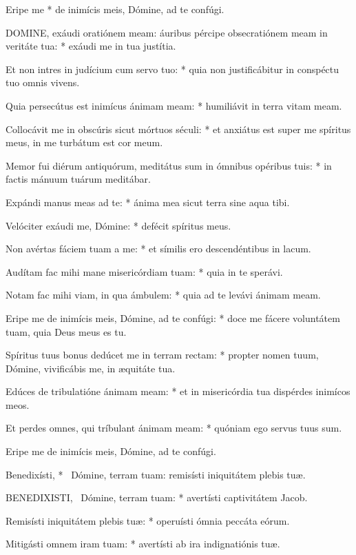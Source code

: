  Eripe me * de inimícis meis, Dómine, ad te confúgi.


\lettrine[lines=2]{D}{OMINE}, exáudi oratiónem meam: áuribus pércipe obsecratiónem meam in veritáte tua: * exáudi me in tua justítia.

Et non intres in judícium cum servo tuo: * quia non justificábitur in conspéctu tuo omnis vivens.

Quia persecútus est inimícus ánimam meam: * humiliávit in terra vitam meam.

Collocávit me in obscúris sicut mórtuos séculi: * et anxiátus est super me spíritus meus, in me turbátum est cor meum.

Memor fui diérum antiquórum, meditátus sum in ómnibus opéribus tuis: * in factis mánuum tuárum meditábar.

Expándi manus meas ad te: * ánima mea sicut terra sine aqua tibi.

Velóciter exáudi me, Dómine: * defécit spíritus meus.

Non avértas fáciem tuam a me: * et símilis ero descendéntibus in lacum.

Audítam fac mihi mane misericórdiam tuam: * quia in te sperávi.

Notam fac mihi viam, in qua ámbulem: * quia ad te levávi ánimam meam.

Eripe me de inimícis meis, Dómine, ad te confúgi: * doce me fácere voluntátem tuam, quia Deus meus es tu.

Spíritus tuus bonus dedúcet me in terram rectam: * propter nomen tuum, Dómine, vivificábis me, in æquitáte tua.

Edúces de tribulatióne ánimam meam: * et in misericórdia tua dispérdes inimícos meos.

Et perdes omnes, qui tríbulant ánimam meam: * quóniam ego servus tuus sum.

 Eripe me de inimícis meis, Dómine, ad te confúgi.

 Benedixísti, * \textdagger\ Dómine, terram tuam: remisísti iniquitátem plebis tuæ.


\lettrine[lines=2]{B}{ENEDIXISTI}, \textdagger\ Dómine, terram tuam: * avertísti captivitátem Jacob.

Remisísti iniquitátem plebis tuæ: * operuísti ómnia peccáta eórum.

Mitigásti omnem iram tuam: * avertísti ab ira indignatiónis tuæ.

